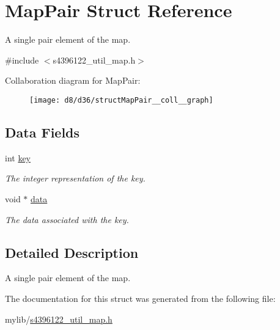 \hypertarget{structMapPair}{}\section{Map\+Pair Struct Reference}
\label{structMapPair}


A single pair element of the map.  




{\ttfamily \#include $<$s4396122\+\_\+util\+\_\+map.\+h$>$}



Collaboration diagram for Map\+Pair\+:\nopagebreak
\begin{figure}[H]
\begin{center}
\leavevmode
\texttt{[image: d8/d36/structMapPair\_\_coll\_\_graph]}
\end{center}
\end{figure}
\subsection*{Data Fields}
\begin{DoxyCompactItemize}
\item 
int \hyperlink{structMapPair_af53f875c2b8789ce00a2bf6afb62fa6f}{key}\hypertarget{structMapPair_af53f875c2b8789ce00a2bf6afb62fa6f}{}\label{structMapPair_af53f875c2b8789ce00a2bf6afb62fa6f}

\begin{DoxyCompactList}\small\item\em The integer representation of the key. \end{DoxyCompactList}\item 
void $\ast$ \hyperlink{structMapPair_a7fb84ba610f72b02859dee69a52b42d1}{data}\hypertarget{structMapPair_a7fb84ba610f72b02859dee69a52b42d1}{}\label{structMapPair_a7fb84ba610f72b02859dee69a52b42d1}

\begin{DoxyCompactList}\small\item\em The data associated with the key. \end{DoxyCompactList}\end{DoxyCompactItemize}


\subsection{Detailed Description}
A single pair element of the map. 

The documentation for this struct was generated from the following file\+:\begin{DoxyCompactItemize}
\item 
mylib/\hyperlink{s4396122__util__map_8h}{s4396122\+\_\+util\+\_\+map.\+h}\end{DoxyCompactItemize}
